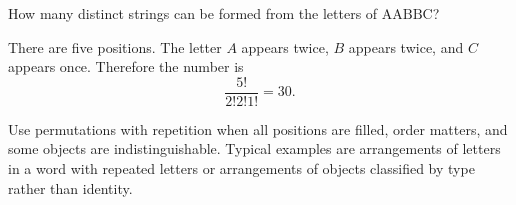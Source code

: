 \begin{examplebox}
How many distinct strings can be formed from the letters of \(\text{AABBC}\)?

There are five positions. The letter \(A\) appears twice, \(B\) appears twice, and \(C\) appears once. Therefore the number is
\[
\frac{5!}{2!2!1!}=30.
\]
\end{examplebox}

\begin{remarkbox}
Use permutations with repetition when all positions are filled, order matters, and some objects are indistinguishable. Typical examples are arrangements of letters in a word with repeated letters or arrangements of objects classified by type rather than identity.
\end{remarkbox}

